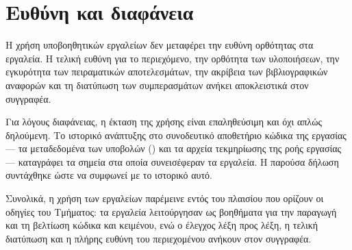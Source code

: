 \section{Ευθύνη και διαφάνεια}
\label{sec:ai-responsibility}

Η χρήση υποβοηθητικών εργαλείων δεν μεταφέρει την ευθύνη ορθότητας στα εργαλεία. Η τελική ευθύνη για το περιεχόμενο, την ορθότητα των υλοποιήσεων, την εγκυρότητα των πειραματικών αποτελεσμάτων, την ακρίβεια των βιβλιογραφικών αναφορών και τη διατύπωση των συμπερασμάτων ανήκει αποκλειστικά στον συγγραφέα.

Για λόγους διαφάνειας, η έκταση της χρήσης είναι επαληθεύσιμη και όχι απλώς δηλούμενη. Το ιστορικό ανάπτυξης στο συνοδευτικό αποθετήριο κώδικα της εργασίας — τα μεταδεδομένα των υποβολών () και τα αρχεία τεκμηρίωσης της ροής εργασίας — καταγράφει τα σημεία στα οποία συνεισέφεραν τα εργαλεία. Η παρούσα δήλωση συντάχθηκε ώστε να συμφωνεί με το ιστορικό αυτό.

Συνολικά, η χρήση των εργαλείων παρέμεινε εντός του πλαισίου που ορίζουν οι οδηγίες του Τμήματος: τα εργαλεία λειτούργησαν ως βοηθήματα για την παραγωγή και τη βελτίωση κώδικα και κειμένου, ενώ ο έλεγχος λέξη προς λέξη, η τελική διατύπωση και η πλήρης ευθύνη του περιεχομένου ανήκουν στον συγγραφέα.
